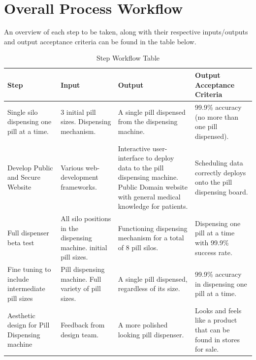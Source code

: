 \documentclass[12pt,titlepage]{article}
\begin{document}
\section{Overall Process Workflow}
An overview of each step to be taken, along with their respective inputs/outputs and output acceptance criteria can be found in the table below.

\begin{table}[ht!]
\begin{center}
\begin{adjustbox}{max width=\textwidth}
\large
\begin{tabular}{|p{}|p{}|p{}|p{}|}
 \hline
 \textbf{Step} & \textbf{Input} & \textbf{Output} & \textbf{Output Acceptance Criteria}\\
 \hline
 Single silo dispensing one pill at a time. & 3 initial pill sizes. \newline Dispensing mechanism. \newline & A single pill dispensed from the dispensing machine. & 99.9\% accuracy (no more than one pill dispensed). \\
 \hline
 Develop Public and Secure Website & Various web-development frameworks. & Interactive user-interface to deploy data to the pill dispensing machine. Public Domain website with general medical knowledge for patients. & Scheduling data correctly deploys onto the pill dispensing board.\\
 \hline
 Full dispenser beta test & All silo positions in the dispensing machine. \newline 3 initial pill sizes. & Functioning dispensing mechanism for a total of 8 pill silos. & Dispensing one pill at a time with 99.9\% success rate. \\
 \hline
 Fine tuning to include intermediate pill sizes & Pill dispensing machine. \newline Full variety of pill sizes. & A single pill dispensed, regardless of its size. & 99.9\% accuracy in dispensing one pill at a time.\\
 \hline
 Aesthetic design for Pill Dispensing machine & Feedback from design team. & A more polished looking pill dispenser. & Looks and feels like a product that can be found in stores for sale. \\
 \hline
 
 
 
\end{tabular}
\end{adjustbox}
\end{center}
\caption{Step Workflow  Table}
\end{table}
\end{document}
